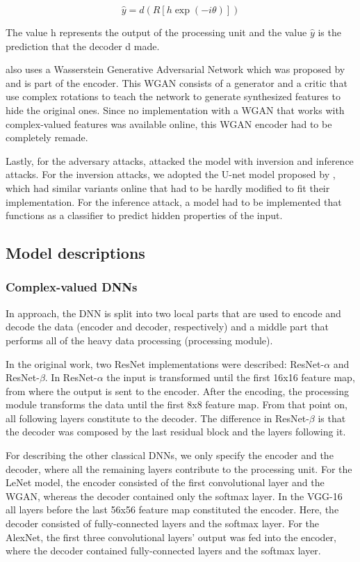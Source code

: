 \begin{equation}
    \hat{y} = d(R[h \exp(-i\theta)])
    \label{eq_decoder}
\end{equation}

The value h represents the output of the processing unit and the value $\hat{y}$ is the prediction that the decoder d made.

\cite{xiang2020interpretable} also uses a Wasserstein Generative Adversarial Network which was proposed by \cite{pmlr-v70-arjovsky17a} and is part of the encoder. This WGAN consists of a generator and a critic that use complex rotations to teach the network to generate synthesized features to hide the original ones. Since no implementation with a WGAN that works with complex-valued features was available online, this WGAN encoder had to be completely remade.

Lastly, for the adversary attacks, \cite{xiang2020interpretable} attacked the model with inversion and inference attacks. For the inversion attacks, we adopted the U-net model proposed by \cite{U-net}, which had similar variants online that had to be hardly modified to fit their implementation. For the inference attack, a model had to be implemented that functions as a classifier to predict hidden properties of the input.

\subsection{Model descriptions}
\subsubsection{Complex-valued DNNs}
In \cite{xiang2020interpretable} approach, the DNN is split into two local parts that are used to encode and decode the data (encoder and decoder, respectively) and a middle part that performs all of the heavy data processing (processing module). 

In the original work, two ResNet implementations were described: ResNet-$\alpha$ and ResNet-$\beta$. In ResNet-$\alpha$ the input is transformed until the first 16x16 feature map, from where the output is sent to the encoder. After the encoding, the processing module transforms the data until the first 8x8 feature map. From that point on, all following layers constitute to the decoder. The difference in ResNet-$\beta$ is that the decoder was composed by the last residual block and the layers following it. 

For describing the other classical DNNs, we only specify the encoder and the decoder, where all the remaining layers contribute to the processing unit. For the LeNet model, the encoder consisted of the first convolutional layer and the WGAN, whereas the decoder contained only the softmax layer. In the VGG-16 all layers before the last 56x56 feature map constituted the encoder. Here, the decoder consisted of fully-connected layers and the softmax layer. For the AlexNet, the first three convolutional layers' output was fed into the encoder, where the decoder contained fully-connected layers and the softmax layer.


